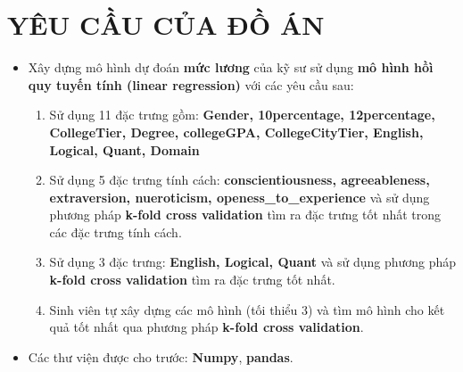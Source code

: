 \documentclass{report}
\begin{document}
\section{YÊU CẦU CỦA ĐỒ ÁN}
\begin{itemize}
    \item Xây dựng mô hình dự đoán \textbf{mức lương} của kỹ sư sử dụng \textbf{mô hình hồì quy tuyến tính (linear regression)} với các yêu cầu sau:
    \begin{enumerate}
        \item Sử dụng 11 đặc trưng gồm: \textbf{Gender, 10percentage, 12percentage, CollegeTier, Degree, collegeGPA, CollegeCityTier, English, Logical, Quant, Domain}
    
        \item Sử dụng 5 đặc trưng tính cách: \textbf{conscientiousness, agreeableness, extraversion, nueroticism, openess\_to\_experience} và sử dụng phương pháp \textbf{k-fold cross validation} tìm ra đặc trưng tốt nhất trong các đặc trưng tính cách.
        
         \item Sử dụng 3 đặc trưng: \textbf{English, Logical, Quant} và sử dụng phương pháp \textbf{k-fold cross validation} tìm ra đặc trưng tốt nhất.
 
        \item Sinh viên tự xây dựng các mô hình (tối thiểu 3) và tìm mô hình cho kết quả tốt nhất qua phương pháp \textbf{k-fold cross validation}.
    \end{enumerate}

    \item Các thư viện được cho trước: \textbf{Numpy}, \textbf{pandas}.
\end{itemize}
\end{document}
